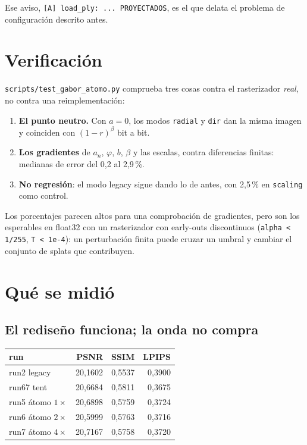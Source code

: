 \documentclass[12pt]{extarticle}
\newcommand{\code}[1]{\texttt{#1}}
\begin{document}
Ese aviso, \code{[A] load\_ply: ... PROYECTADOS}, es el que delata el problema
de configuración descrito antes.

\section{Verificación}

\code{scripts/test\_gabor\_atomo.py} comprueba tres cosas contra el
rasterizador \emph{real}, no contra una reimplementación:

\begin{enumerate}
\item \textbf{El punto neutro.} Con $a=0$, los modos \code{radial} y \code{dir}
      dan la misma imagen y coinciden con $(1-r)^\beta$ bit a bit.
\item \textbf{Los gradientes} de $a_n$, $\varphi$, $b$, $\beta$ y las escalas,
      contra diferencias finitas: medianas de error del 0,2 al
      2,9\,\%.
\item \textbf{No regresión}: el modo legacy sigue dando lo de antes, con
      2,5\,\% en \code{scaling} como control.
\end{enumerate}

Los porcentajes parecen altos para una comprobación de gradientes, pero son los
esperables en float32 con un rasterizador con early-outs discontinuos
(\code{alpha < 1/255}, \code{T < 1e-4}): un perturbación finita puede cruzar un
umbral y cambiar el conjunto de splats que contribuyen.

\section{Qué se midió}

\subsection{El rediseño funciona; la onda no compra}

\begin{center}\small
\begin{tabular}{@{}lrrr@{}}
\toprule
\textbf{run} & \textbf{PSNR} & \textbf{SSIM} & \textbf{LPIPS} \\
\midrule
run2 legacy      & 20,1602 & 0,5537 & 0,3900 \\
run67 tent       & 20,6684 & 0,5811 & 0,3675 \\
\midrule
run5 átomo $1\times$ & 20,6898 & 0,5759 & 0,3724 \\
run6 átomo $2\times$ & 20,5999 & 0,5763 & 0,3716 \\
run7 átomo $4\times$ & 20,7167 & 0,5758 & 0,3720 \\
\bottomrule
\end{tabular}
\end{center}
\end{document}
